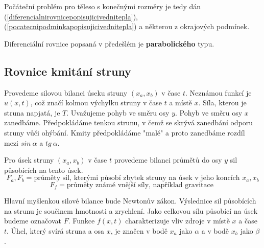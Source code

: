 Počáteční problém pro těleso s konečnými rozměry je tedy dán (\ref{diferencialnirovnicepopisujicivednitepla}), (\ref{pocatecnipodminkapopisujicivednitepla}) a některou z okrajových podmínek.

Diferenciální rovnice popsaná v předešlém je \textbf{parabolického} typu.

\subsection{Rovnice kmitání struny}
 Provedeme silovou bilanci úseku struny $(x_a,x_b)$ v čase $t$. Neznámou funkcí je $u(x,t)$, což značí kolmou výchylku struny v čase $t$ a místě $x$. Síla, kterou je struna napjatá, je $T$. Uvažujeme pohyb ve směru osy $y$. Pohyb ve směru osy $x$ zanedbáme. Předpokládáme tenkou strunu, v čemž se skrývá zanedbání odporu struny vůči ohýbání. Kmity předpokládáme "malé" a proto zanedbáme rozdíl mezi $sin \ \alpha$ a $tg \ \alpha$.
 
 Pro úsek struny $(x_a,x_b)$ v čase $t$ provedeme bilanci průmětů do osy $y$ sil působících na tento úsek.
 $$F_a, F_b=\textrm{průměty sil, kterými působí zbytek struny na úsek v jeho koncích }x_a,x_b $$
 $$F_f=\textrm{průměty známé vnější síly, například gravitace }$$
 
 Hlavní myšlenkou silové bilance bude Newtonův zákon. Výslednice sil působících na strunu je součinem hmotnosti a zrychlení. Jako celkovou sílu působící na úsek budeme označovat $F$. Funkce $f(x,t)$ charakterizuje vliv zdroje v místě $x$ a čase $t$. Úhel, který svírá struna a osa $x$, je značen v bodě $x_a$ jako $\alpha$ a v bodě $x_b$ jako $\beta$.

